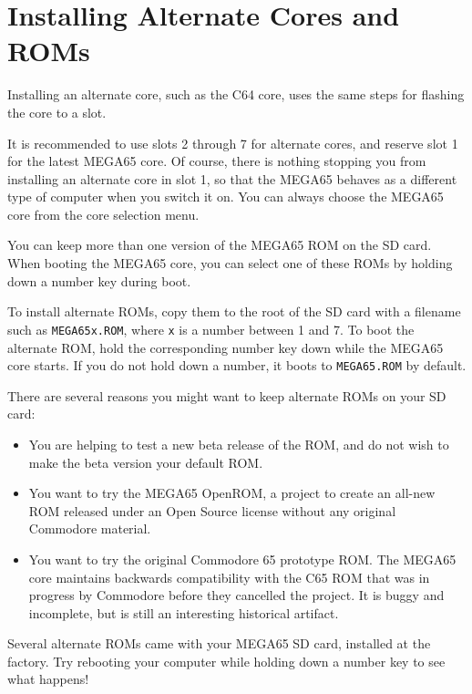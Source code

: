 \section{Installing Alternate Cores and ROMs}

Installing an alternate core, such as the C64 core, uses the same steps for flashing the core to a slot.

It is recommended to use slots 2 through 7 for alternate cores, and reserve slot 1 for the latest MEGA65 core. Of course, there is nothing stopping you from installing an alternate core in slot 1, so that the MEGA65 behaves as a different type of computer when you switch it on. You can always choose the MEGA65 core from the core selection menu.

You can keep more than one version of the MEGA65 ROM on the SD card. When booting the MEGA65 core, you can select one of these ROMs by holding down a number key during boot.

To install alternate ROMs, copy them to the root of the SD card with a filename such as {\tt MEGA65x.ROM}, where {\tt x} is a number between 1 and 7. To boot the alternate ROM, hold the corresponding number key down while the MEGA65 core starts. If you do not hold down a number, it boots to {\tt MEGA65.ROM} by default.

There are several reasons you might want to keep alternate ROMs on your SD card:

\begin{itemize}
  \item You are helping to test a new beta release of the ROM, and do not wish to make the beta version your default ROM.
  \item You want to try the MEGA65 OpenROM, a project to create an all-new ROM released under an Open Source license without any original Commodore material.
  \item You want to try the original Commodore 65 prototype ROM. The MEGA65 core maintains backwards compatibility with the C65 ROM that was in progress by Commodore before they cancelled the project. It is buggy and incomplete, but is still an interesting historical artifact.
\end{itemize}

Several alternate ROMs came with your MEGA65 SD card, installed at the factory. Try rebooting your computer while holding down a number key to see what happens!




